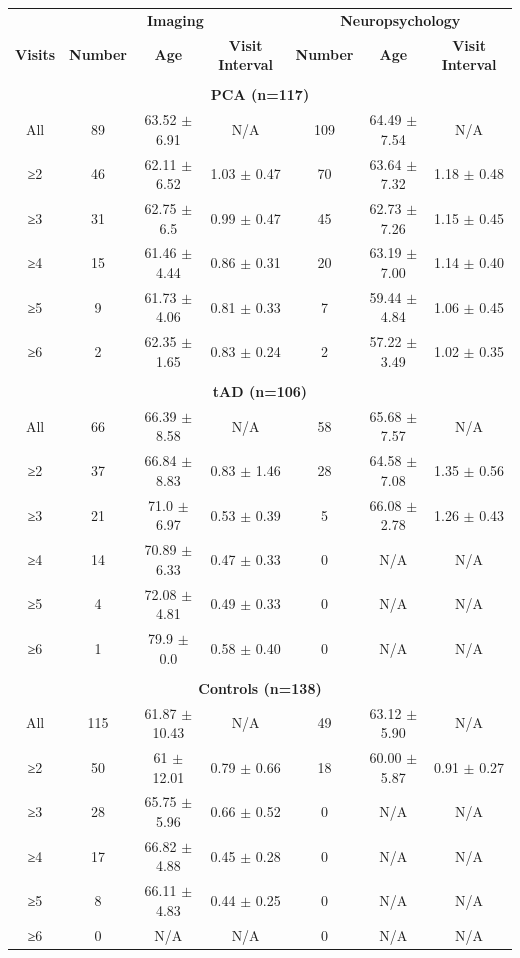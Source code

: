 \begin{table}
\centering
\begin{tabular}{c | c c c | c c c}
 & \multicolumn{3}{c|}{\textbf{Imaging}} & \multicolumn{3}{c}{\textbf{Neuropsychology}}\\
\textbf{Visits} & \textbf{Number} & \textbf{Age} & \textbf{Visit Interval} & \textbf{Number} & \textbf{Age} & \textbf{Visit Interval} \\
\multicolumn{7}{c}{}\\
\multicolumn{7}{c}{\textbf{PCA (n=117)}}\\
\hline
All & 89 & 63.52 $\pm$ 6.91 & N/A & 109 & 64.49 $\pm$ 7.54 & N/A \\
≥2 & 46 & 62.11 $\pm$ 6.52 & 1.03 $\pm$ 0.47 & 70 & 63.64 $\pm$ 7.32 & 1.18 $\pm$ 0.48 \\
≥3 & 31 & 62.75 $\pm$ 6.5 & 0.99 $\pm$ 0.47 & 45 & 62.73 $\pm$ 7.26 & 1.15 $\pm$ 0.45 \\ 
≥4 & 15 & 61.46 $\pm$ 4.44 & 0.86 $\pm$ 0.31 & 20 & 63.19 $\pm$ 7.00 & 1.14 $\pm$ 0.40 \\ 
≥5 & 9 & 61.73 $\pm$ 4.06 & 0.81 $\pm$ 0.33 & 7 & 59.44 $\pm$ 4.84 & 1.06 $\pm$ 0.45 \\
≥6 & 2 & 62.35 $\pm$ 1.65 & 0.83 $\pm$ 0.24 & 2 & 57.22 $\pm$ 3.49 & 1.02 $\pm$ 0.35 \\
\multicolumn{7}{c}{}\\
\multicolumn{7}{c}{\textbf{tAD (n=106)}} \\ 
\hline
All & 66 & 66.39 $\pm$ 8.58 & N/A & 58 & 65.68 $\pm$ 7.57 & N/A \\
≥2 & 37 & 66.84 $\pm$ 8.83 & 0.83 $\pm$ 1.46 & 28 & 64.58 $\pm$ 7.08 & 1.35 $\pm$ 0.56 \\ 
≥3 & 21 & 71.0 $\pm$ 6.97 & 0.53 $\pm$ 0.39 & 5 & 66.08 $\pm$ 2.78 & 1.26 $\pm$ 0.43 \\ 
≥4 & 14 & 70.89 $\pm$ 6.33 & 0.47 $\pm$ 0.33 & 0 & N/A & N/A \\
≥5 & 4 & 72.08 $\pm$ 4.81 & 0.49 $\pm$ 0.33 & 0 & N/A & N/A \\ 
≥6 & 1 & 79.9 $\pm$ 0.0 & 0.58 $\pm$ 0.40 & 0 & N/A & N/A \\
\multicolumn{7}{c}{}\\
\multicolumn{7}{c}{\textbf{Controls (n=138)}} \\
\hline
All & 115 & 61.87 $\pm$ 10.43 & N/A & 49 & 63.12 $\pm$ 5.90 & N/A \\
≥2 & 50 & 61 $\pm$ 12.01 & 0.79 $\pm$ 0.66 & 18 & 60.00 $\pm$ 5.87 & 0.91 $\pm$ 0.27 \\
≥3 & 28 & 65.75 $\pm$ 5.96 & 0.66 $\pm$ 0.52 & 0 & N/A & N/A \\
≥4 & 17 & 66.82 $\pm$ 4.88 & 0.45 $\pm$ 0.28 & 0 & N/A & N/A \\
≥5 & 8 & 66.11 $\pm$ 4.83 & 0.44 $\pm$ 0.25 & 0 & N/A & N/A \\
≥6 & 0 & N/A & N/A & 0 & N/A & N/A \\


\end{tabular}
\end{table}
